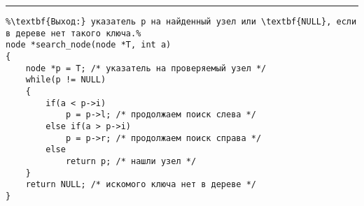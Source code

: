 \documentclass{article}
\begin{document}
\vspace{5pt} \hrule
\begin{lstlisting}[caption={Поиск узла в дереве сортировки}, label=p316_search_node, escapechar=\%]
%\noindent\textbf{Вход:} дерево сортировки T, заданное указателем на корень; ключ a: key.\\%
%\textbf{Выход:} указатель p на найденный узел или \textbf{NULL}, если в дереве нет такого ключа.%
node *search_node(node *T, int a)
{
	node *p = T; /* указатель на проверяемый узел */
	while(p != NULL)
	{
		if(a < p->i)
			p = p->l; /* продолжаем поиск слева */
		else if(a > p->i)
			p = p->r; /* продолжаем поиск справа */
		else
			return p; /* нашли узел */
	}
	return NULL; /* искомого ключа нет в дереве */
}
\end{lstlisting}
\end{document}
